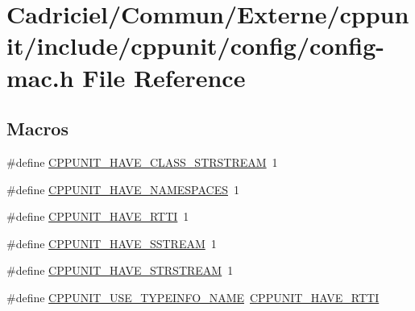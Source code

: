 \hypertarget{config-mac_8h}{\section{Cadriciel/\-Commun/\-Externe/cppunit/include/cppunit/config/config-\/mac.h File Reference}
\label{config-mac_8h}
}
\subsection*{Macros}
\begin{DoxyCompactItemize}
\item 
\#define \hyperlink{config-mac_8h_a3f3eed078f74a4edf54d5a170d43195b}{C\-P\-P\-U\-N\-I\-T\-\_\-\-H\-A\-V\-E\-\_\-\-C\-L\-A\-S\-S\-\_\-\-S\-T\-R\-S\-T\-R\-E\-A\-M}~1
\item 
\#define \hyperlink{config-mac_8h_a3ab513bf42c44fb8ea41bd9e91249975}{C\-P\-P\-U\-N\-I\-T\-\_\-\-H\-A\-V\-E\-\_\-\-N\-A\-M\-E\-S\-P\-A\-C\-E\-S}~1
\item 
\#define \hyperlink{config-mac_8h_aa57c801a8aa25a44f91b88435ebdfc99}{C\-P\-P\-U\-N\-I\-T\-\_\-\-H\-A\-V\-E\-\_\-\-R\-T\-T\-I}~1
\item 
\#define \hyperlink{config-mac_8h_abfac7981ab6ff3283d18d6f843060012}{C\-P\-P\-U\-N\-I\-T\-\_\-\-H\-A\-V\-E\-\_\-\-S\-S\-T\-R\-E\-A\-M}~1
\item 
\#define \hyperlink{config-mac_8h_a791a693d3aa69a5b220ca00dd7212b8d}{C\-P\-P\-U\-N\-I\-T\-\_\-\-H\-A\-V\-E\-\_\-\-S\-T\-R\-S\-T\-R\-E\-A\-M}~1
\item 
\#define \hyperlink{config-mac_8h_a40c5e2a5f158770c99264e4a3e76c7c7}{C\-P\-P\-U\-N\-I\-T\-\_\-\-U\-S\-E\-\_\-\-T\-Y\-P\-E\-I\-N\-F\-O\-\_\-\-N\-A\-M\-E}~\hyperlink{config-msvc6_8h_aa57c801a8aa25a44f91b88435ebdfc99}{C\-P\-P\-U\-N\-I\-T\-\_\-\-H\-A\-V\-E\-\_\-\-R\-T\-T\-I}
\end{DoxyCompactItemize}


